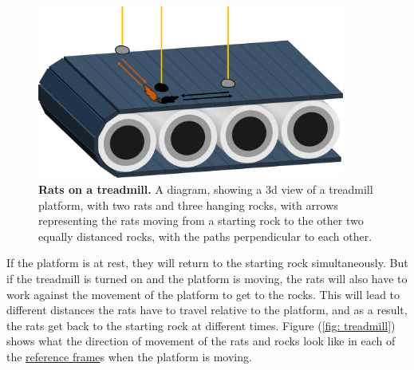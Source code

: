 \begin{figure}[H]
	\centering
	\includegraphics[width = 0.9\textwidth]{images/pdf/Conveyor_belt_3d.pdf}
	\caption{\textbf{Rats on a treadmill.} A diagram, showing a 3d view of a treadmill platform, with two rats and three hanging rocks, with arrows representing the rats moving from a starting rock to the other two equally distanced rocks, with the paths perpendicular to each other.}
	\label{fig: 3d conveyor belt}
\end{figure}

If the platform is at rest, they will return to the starting rock simultaneously.
But if the treadmill is turned on and the platform is moving, the rats will also have to work against the movement of the platform to get to the rocks.
This will lead to different distances the rats have to travel relative to the platform, and as a result, the rats get back to the starting rock at different times.
Figure (\ref{fig: treadmill}) shows what the direction of movement of the rats and rocks look like in each of the \hyperlink{def-Reference-frame}{reference frame}s when the platform is moving.


